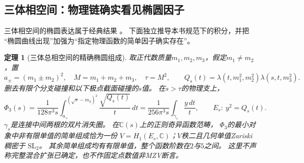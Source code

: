 \documentclass[11pt,a4paper]{ctexart}
\theoremstyle{cnplain}\newtheorem{theorem}{定理}[section]
\theoremstyle{definition}\newtheorem{definition}[theorem]{定义}
\theoremstyle{remark}\newtheorem{remark}[theorem]{注}
\begin{document}
\subsection{三体相空间：物理链确实看见椭圆因子}
三体相空间的椭圆表达属于经典结果
\cite[式(1.1)--(1.7)]{DDphase}。
下面独立推导本书规范下的积分，并把
“椭圆曲线出现”加强为“指定物理函数的简单因子确实存在”。

\begin{theorem}[三体总相空间的精确椭圆组成]\label{thm:threebodyvisible}
取正代数质量$m_1,m_2,m_3$，假定$m_1\ne m_2$，置
\[
 a_\pm=(m_1\pm m_2)^2,\quad M=m_1+m_2+m_3,\quad \tau=M^2,
 \qquad Q_s(t)=\lambda(t,m_1^2,m_2^2)\lambda(s,t,m_3^2).
\]
删去有限个分支碰撞和以下极点截面碰撞的$s$值。
在$s>\tau$的物理支上，
\begin{equation}\label{eq:threephase}
 \Phi_3(s)=\frac{1}{128\pi^3s}
       \int_{a_+}^{(\sqrt s-m_3)^2}\frac{\sqrt{Q_s(t)}}{t}\,dt
     =\frac{1}{256\pi^3s}\int_{\gamma_s}\frac{y\,dt}{t},
 \qquad E_s:\ y^2=Q_s(t).
\end{equation}
$\gamma_s$是连接中间两根的双片消失圈。
在$\mathbb C(s)$上的正则奇异函数范畴，
$\Phi_3$的最小对象中非有限单值的简单组成恰为一份
$V=H_1(E_s,\mathbb C)$；$V$秩二且几何单值Zariski稠密于
$\mathrm{SL}_2$。
其余简单组成均有有限单值，整个函数阶数在$2$与$5$之间。
这里不声称完整混合扩张已确定，也不作固定点数值非MZV断言。
\end{theorem}
\end{document}

